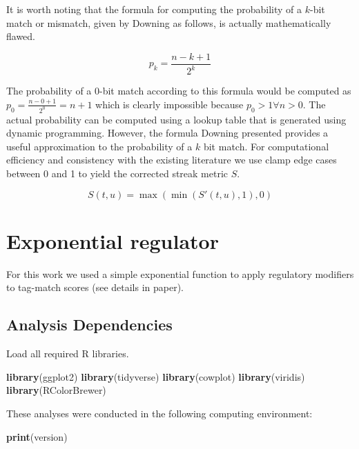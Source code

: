 \documentclass[]{book}
\newenvironment{Shaded}{\begin{snugshade}}{\end{snugshade}}
\newcommand{\KeywordTok}[1]{\textcolor[rgb]{0.13,0.29,0.53}{\textbf{#1}}}
\newcommand{\NormalTok}[1]{#1}
\begin{document}
It is worth noting that the formula for computing the probability of a \(k\)-bit match or mismatch, given by Downing as follows, is actually mathematically flawed.

\[
p_k
= \frac{n - k + 1}{2^k}
\]

The probability of a \(0\)-bit match according to this formula would be computed as \(p_0 = \frac{n - 0 + 1}{2^0} = n + 1\) which is clearly impossible because \(p_0 > 1 \forall n > 0\).
The actual probability can be computed using a lookup table that is generated using dynamic programming.
However, the formula Downing presented provides a useful approximation to the probability of a \(k\) bit match.
For computational efficiency and consistency with the existing literature we use clamp edge cases between 0 and 1 to yield the corrected streak metric \(S\).

\[
S(t, u) =
\max( \min( S'(t, u), 1), 0)
\]

\hypertarget{exponential-regulator}{%
\chapter{Exponential regulator}\label{exponential-regulator}}

For this work we used a simple exponential function to apply regulatory modifiers to tag-match scores (see details in paper).

\hypertarget{analysis-dependencies}{%
\section{Analysis Dependencies}\label{analysis-dependencies}}

Load all required R libraries.

\begin{Shaded}
\begin{Highlighting}[]
\KeywordTok{library}\NormalTok{(ggplot2)}
\KeywordTok{library}\NormalTok{(tidyverse)}
\KeywordTok{library}\NormalTok{(cowplot)}
\KeywordTok{library}\NormalTok{(viridis)}
\KeywordTok{library}\NormalTok{(RColorBrewer)}
\end{Highlighting}
\end{Shaded}

These analyses were conducted in the following computing environment:

\begin{Shaded}
\begin{Highlighting}[]
\KeywordTok{print}\NormalTok{(version)}
\end{Highlighting}
\end{Shaded}
\end{document}
